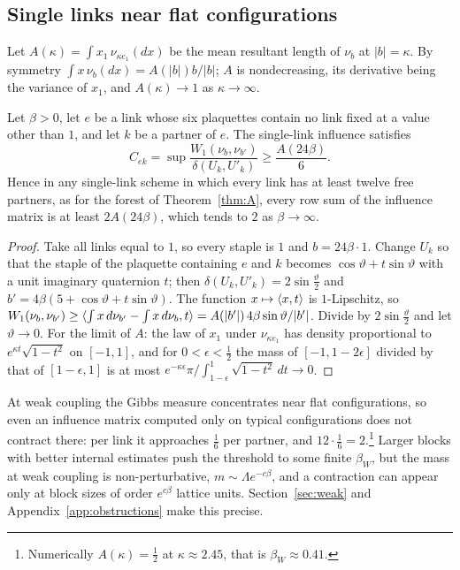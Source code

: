 \subsection{Single links near flat configurations}

Let $A(\kappa)=\int x_1\,\nu_{\kappa e_1}(dx)$ be the mean resultant length of
$\nu_b$ at $|b|=\kappa$. By symmetry $\int x\,\nu_b(dx)=A(|b|)b/|b|$; $A$ is
nondecreasing, its derivative being the variance of $x_1$, and
$A(\kappa)\to1$ as $\kappa\to\infty$.

\begin{proposition}\label{prop:flat}
Let $\beta>0$, let $e$ be a link whose six plaquettes contain no link fixed at a
value other than $1$, and let $k$ be a partner of $e$. The single-link influence
satisfies
\[
C_{ek}=\sup\frac{W_1(\nu_b,\nu_{b'})}{\delta(U_k,U'_k)}\ge\frac{A(24\beta)}6 .
\]
Hence in any single-link scheme in which every link has at least twelve free
partners, as for the forest of Theorem~\ref{thm:A}, every row sum of the
influence matrix is at least $2A(24\beta)$, which tends to $2$ as
$\beta\to\infty$.
\end{proposition}

\begin{proof}
Take all links equal to $1$, so every staple is $1$ and $b=24\beta\cdot1$.
Change $U_k$ so that the staple of the plaquette containing $e$ and $k$
becomes $\cos\vartheta+t\sin\vartheta$ with a unit imaginary quaternion $t$;
then $\delta(U_k,U'_k)=2\sin\frac\vartheta2$ and $b'=4\beta(5+\cos\vartheta+
t\sin\vartheta)$. The function $x\mapsto\langle x,t\rangle$ is $1$-Lipschitz, so
$W_1(\nu_b,\nu_{b'})\ge\langle \int x\,d\nu_{b'}-\int x\,d\nu_b,t\rangle=A(|b'|)\,
4\beta\sin\vartheta/|b'|$. Divide by $2\sin\frac\vartheta2$ and let
$\vartheta\to0$. For the limit of $A$: the law of $x_1$ under
$\nu_{\kappa e_1}$ has density proportional to $e^{\kappa t}\sqrt{1-t^2}$ on
$[-1,1]$, and for $0<\epsilon<\frac12$ the mass of $[-1,1-2\epsilon]$ divided
by that of $[1-\epsilon,1]$ is at most $e^{-\kappa\epsilon}\pi/\int_{1-
\epsilon}^1\sqrt{1-t^2}\,dt\to0$.
\end{proof}

At weak coupling the Gibbs measure concentrates near flat configurations, so
even an influence matrix computed only on typical configurations does not
contract there: per link it approaches $\frac16$ per partner, and
$12\cdot\frac16=2$.\footnote{Numerically $A(\kappa)=\frac12$ at
$\kappa\approx2.45$, that is $\beta_W\approx0.41$.} Larger blocks with better
internal estimates push the threshold to some finite $\beta_W$, but the mass at
weak coupling is non-perturbative, $m\sim\Lambda e^{-c\beta}$, and a
contraction can appear only at block sizes of order $e^{c\beta}$ lattice units.
Section~\ref{sec:weak} and Appendix~\ref{app:obstructions} make this precise.
